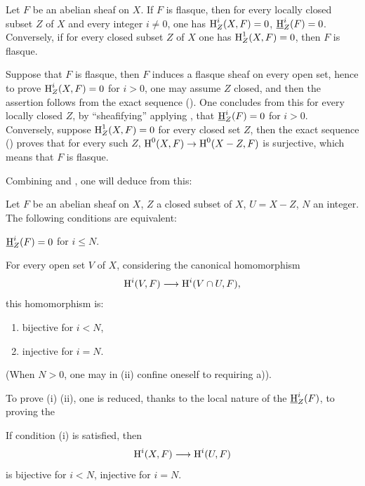 \begin{corollary} \label{I.2.12}
Let $F$ be an abelian sheaf on $X$. If $F$ is flasque, then for every locally closed subset $Z$ of $X$ and every integer $i\neq 0$, one has $\operatorname{H}^i_Z(X, F)=0$, $\operatorname{\underline{H}}^i_Z(F)=0$. Conversely, if for every closed subset $Z$ of $X$ one has $\operatorname{H}_Z^1(X, F)=0$, then $F$ is flasque.
\end{corollary}

Suppose that $F$ is flasque, then $F$ induces a flasque sheaf on every open set, hence to prove $\operatorname{H}^i_Z(X, F)=0$ for $i>0$, one may assume $Z$ closed, and then the assertion follows from the exact sequence (). One concludes from this for every locally closed $Z$, by ``sheafifying'' \ie applying , that $\operatorname{\underline{H}}^i_Z(F)=0$ for $i>0$. Conversely, suppose $\operatorname{H}^1_Z(X, F)=0$ for every closed set $Z$, then the exact sequence () proves that for every such $Z$, $\H^0(X, F) \to \H^0(X-Z, F)$ is surjective, which means that $F$ is flasque.

Combining  and , one will deduce from this:

\begin{proposition} \label{I.2.13}
Let $F$ be an abelian sheaf on $X$, $Z$ a closed subset of $X$, $U=X-Z$, $N$ an integer. The following conditions are equivalent:
\begin{enumeratei}
\item
$\operatorname{\underline{H}}^i_Z(F)=0$ for $i\leq N$.
\item
For every open set $V$ of $X$, considering the canonical homomorphism
$$
\H^i(V, F) \to \H^i(V\cap U, F),$$
this homomorphism is:
\begin{enumerate}
\item[\textup{a)}] bijective for $i<N$,
\item[\textup{b)}] injective for $i=N$.
\end{enumerate}
\end{enumeratei}
\noindent
(When $N>0$, one may in \textup{(ii)} confine oneself to requiring \textup{a)}).
\end{proposition}

To prove (i) \ALORS (ii), one is reduced, thanks to the local nature of the $\operatorname{\underline{H}}_Z^i(F)$, to proving the

\begin{corollary} \label{I.2.14}
If condition  (i) is satisfied, then
$$
\H^i(X, F) \to \H^i(U, F)$$
is bijective for $i<N$, injective for $i=N$.
\end{corollary}

